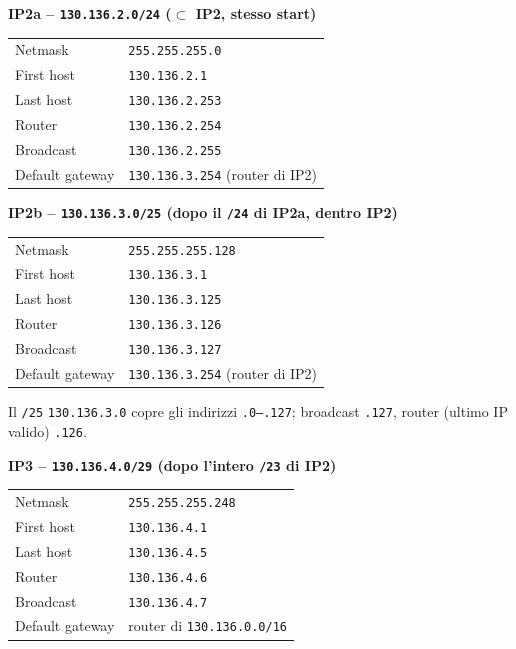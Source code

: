 \documentclass{report}
\begin{document}
\begin{solution}
\noindent\textbf{IP2a -- \texttt{130.136.2.0/24} ($\subset$ IP2, stesso start)}
\begin{center}
\begin{tabular}{ll}
\hline
Netmask & \texttt{255.255.255.0} \\
First host & \texttt{130.136.2.1} \\
Last host & \texttt{130.136.2.253} \\
Router & \texttt{130.136.2.254} \\
Broadcast & \texttt{130.136.2.255} \\
Default gateway & \texttt{130.136.3.254} (router di IP2) \\
\hline
\end{tabular}
\end{center}

\noindent\textbf{IP2b -- \texttt{130.136.3.0/25} \;(dopo il \texttt{/24} di IP2a,
dentro IP2)}
\begin{center}
\begin{tabular}{ll}
\hline
Netmask & \texttt{255.255.255.128} \\
First host & \texttt{130.136.3.1} \\
Last host & \texttt{130.136.3.125} \\
Router & \texttt{130.136.3.126} \\
Broadcast & \texttt{130.136.3.127} \\
Default gateway & \texttt{130.136.3.254} (router di IP2) \\
\hline
\end{tabular}
\end{center}
Il \texttt{/25} \texttt{130.136.3.0} copre gli indirizzi \texttt{.0--.127};
broadcast \texttt{.127}, router (ultimo IP valido) \texttt{.126}.

\noindent\textbf{IP3 -- \texttt{130.136.4.0/29} \;(dopo l'intero \texttt{/23} di
IP2)}
\begin{center}
\begin{tabular}{ll}
\hline
Netmask & \texttt{255.255.255.248} \\
First host & \texttt{130.136.4.1} \\
Last host & \texttt{130.136.4.5} \\
Router & \texttt{130.136.4.6} \\
Broadcast & \texttt{130.136.4.7} \\
Default gateway & router di \texttt{130.136.0.0/16} \\
\hline
\end{tabular}
\end{center}


\end{solution}
\end{document}
